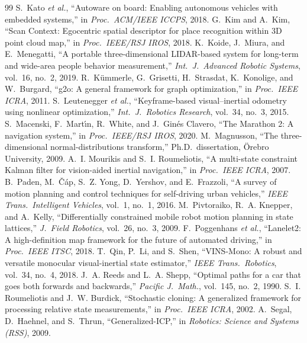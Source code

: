 \documentclass[11pt,a4paper]{article}
\begin{document}
\begin{thebibliography}{99}
 S.~Kato \emph{et al.}, ``Autoware on board: Enabling autonomous vehicles with embedded systems,'' in \emph{Proc.\ ACM/IEEE ICCPS}, 2018.
 G.~Kim and A.~Kim, ``Scan Context: Egocentric spatial descriptor for place recognition within 3D point cloud map,'' in \emph{Proc.\ IEEE/RSJ IROS}, 2018.
 K.~Koide, J.~Miura, and E.~Menegatti, ``A portable three-dimensional LIDAR-based system for long-term and wide-area people behavior measurement,'' \emph{Int.\ J.\ Advanced Robotic Systems}, vol.~16, no.~2, 2019.
 R.~K{\"u}mmerle, G.~Grisetti, H.~Strasdat, K.~Konolige, and W.~Burgard, ``g2o: A general framework for graph optimization,'' in \emph{Proc.\ IEEE ICRA}, 2011.
 S.~Leutenegger \emph{et al.}, ``Keyframe-based visual--inertial odometry using nonlinear optimization,'' \emph{Int.\ J.\ Robotics Research}, vol.~34, no.~3, 2015.
 S.~Macenski, F.~Mart{\'\i}n, R.~White, and J.~Gin{\'e}s Clavero, ``The Marathon 2: A navigation system,'' in \emph{Proc.\ IEEE/RSJ IROS}, 2020.
 M.~Magnusson, ``The three-dimensional normal-distributions transform,'' Ph.D.\ dissertation, {\"O}rebro University, 2009.
 A.~I. Mourikis and S.~I. Roumeliotis, ``A multi-state constraint Kalman filter for vision-aided inertial navigation,'' in \emph{Proc.\ IEEE ICRA}, 2007.
 B.~Paden, M.~{\v C}\'ap, S.~Z. Yong, D.~Yershov, and E.~Frazzoli, ``A survey of motion planning and control techniques for self-driving urban vehicles,'' \emph{IEEE Trans.\ Intelligent Vehicles}, vol.~1, no.~1, 2016.
 M.~Pivtoraiko, R.~A. Knepper, and A.~Kelly, ``Differentially constrained mobile robot motion planning in state lattices,'' \emph{J.\ Field Robotics}, vol.~26, no.~3, 2009.
 F.~Poggenhans \emph{et al.}, ``Lanelet2: A high-definition map framework for the future of automated driving,'' in \emph{Proc.\ IEEE ITSC}, 2018.
 T.~Qin, P.~Li, and S.~Shen, ``VINS-Mono: A robust and versatile monocular visual-inertial state estimator,'' \emph{IEEE Trans.\ Robotics}, vol.~34, no.~4, 2018.
 J.~A. Reeds and L.~A. Shepp, ``Optimal paths for a car that goes both forwards and backwards,'' \emph{Pacific J.\ Math.}, vol.~145, no.~2, 1990.
 S.~I. Roumeliotis and J.~W. Burdick, ``Stochastic cloning: A generalized framework for processing relative state measurements,'' in \emph{Proc.\ IEEE ICRA}, 2002.
 A.~Segal, D.~Haehnel, and S.~Thrun, ``Generalized-ICP,'' in \emph{Robotics: Science and Systems (RSS)}, 2009.

\end{thebibliography}
\end{document}
